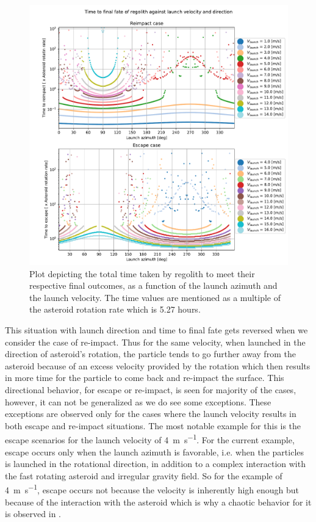 \begin{figure}[htb]
\centering
\captionsetup{justification=centering}
\includegraphics[width=\textwidth, height=0.6\textheight, keepaspectratio=true]{Images/longest_edge_no_perturbations/time_to_final_fate_all_velocities.pdf}
\caption{Plot depicting the total time taken by regolith to meet their respective final outcomes, as a function of the launch azimuth and the launch velocity. The time values are mentioned as a multiple of the asteroid rotation rate which is 5.27 hours.}
\label{fig:final_fate_time_noSP}
\end{figure}
\FloatBarrier
This situation with launch direction and time to final fate gets reversed when we consider the case of re-impact. Thus for the same velocity, when launched in the direction of asteroid's rotation, the particle tends to go further away from the asteroid because of an excess velocity provided by the rotation which then results in more time for the particle to come back and re-impact the surface. This directional behavior, for escape or re-impact, is seen for majority of the cases, however, it can not be generalized as we do see some exceptions. These exceptions are observed only for the cases where the launch velocity results in both escape and re-impact situations. The most notable example for this is the escape scenarios for the launch velocity of \SI{4}{\metre \per \second}. For the current example, escape occurs only when the launch azimuth is favorable, i.e. when the particles is launched in the rotational direction, in addition to a complex interaction with the fast rotating asteroid and irregular gravity field. So for the example of \SI{4}{\metre \per \second}, escape occurs not because the velocity is inherently high enough but because of the interaction with the asteroid which is why a chaotic behavior for it is observed in .

